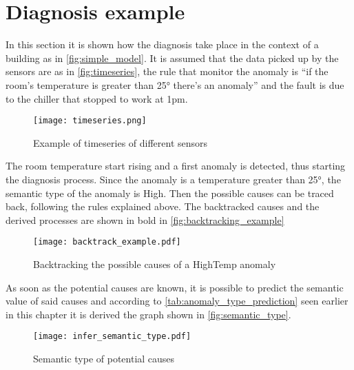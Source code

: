 \section{Diagnosis example}
In this section it is shown how the diagnosis take place in the context of a building as in \autoref{fig:simple_model}. It is assumed that the data picked up by the sensors are as in \autoref{fig:timeseries}, the rule that monitor the anomaly is ``if the room's temperature is greater than \ang{25} there's an anomaly'' and the fault is due to the chiller that stopped to work at 1pm.
\begin{figure}
  \centering
  \texttt{[image: timeseries.png]}
  \caption{Example of timeseries of different sensors}
  \label{fig:timeseries}
\end{figure}
The room temperature start rising and a first anomaly is detected, thus starting the diagnosis process.
Since the anomaly is a temperature greater than \ang{25}, the semantic type of the anomaly is High. Then the possible causes can be traced back, following the rules explained above.
The backtracked causes and the derived processes are shown in bold in \autoref{fig:backtracking_example}
\begin{figure}
  \texttt{[image: backtrack\_example.pdf]}
  \caption{Backtracking the possible causes of a HighTemp anomaly}
  \label{fig:backtracking_example}
\end{figure}
As soon as the potential causes are known, it is possible to predict the semantic value of said causes and according to \autoref{tab:anomaly_type_prediction} seen earlier in this chapter it is derived the graph shown in \autoref{fig:semantic_type}.
\begin{figure}
  \centering
  \texttt{[image: infer\_semantic\_type.pdf]}
  \caption{Semantic type of potential causes}
  \label{fig:semantic_type}
\end{figure}
